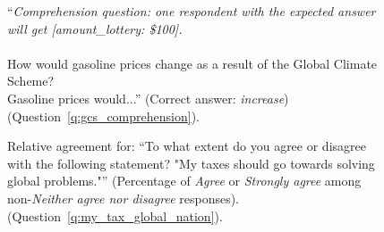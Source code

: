 
\begin{figure}[h!]
    \caption[Comprehension question on GCS]{``\textit{Comprehension question: one respondent with the expected answer will get [amount\_lottery: \$100].}\\\\How would gasoline prices change as a result of the Global Climate Scheme? \\Gasoline prices would...'' (Correct answer: \textit{increase}) (Question~\ref{q:gcs_comprehension}).
    }\label{fig:gcs_comprehension}
\end{figure}

\begin{figure}[h!]
    \caption[Relative agreement: ``My taxes should go towards solving global problems'']{Relative agreement for: ``To what extent do you agree or disagree with the following statement? "My taxes should go towards solving global problems."'' (Percentage of \textit{Agree} or \textit{Strongly agree} among non-\textit{Neither agree nor disagree} responses). (Question~\ref{q:my_tax_global_nation}).
    }\label{fig:my_tax_global_nation_share}
\end{figure}

